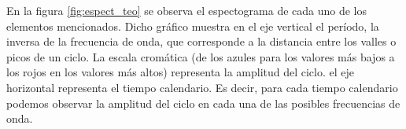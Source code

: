 \documentclass[a4paper]{article}
\begin{document}
En la figura \ref{fig:espect_teo} se observa el espectograma de cada uno de los elementos mencionados. Dicho gráfico muestra en el eje vertical el período, la inversa de la frecuencia de onda, que corresponde a la distancia entre los valles o picos de un ciclo. La escala cromática (de los azules para los valores más bajos a los rojos en los valores más altos) representa la amplitud del ciclo. el eje horizontal representa el tiempo calendario. Es decir, para cada tiempo calendario podemos observar la amplitud del ciclo en cada una de las posibles frecuencias de onda. 

\begin{figure}[H]
	\centering
	    \vspace{0.00mm}
	    \vspace{0.00mm}
	    \vspace{0.00mm}

\end{figure}
\end{document}
